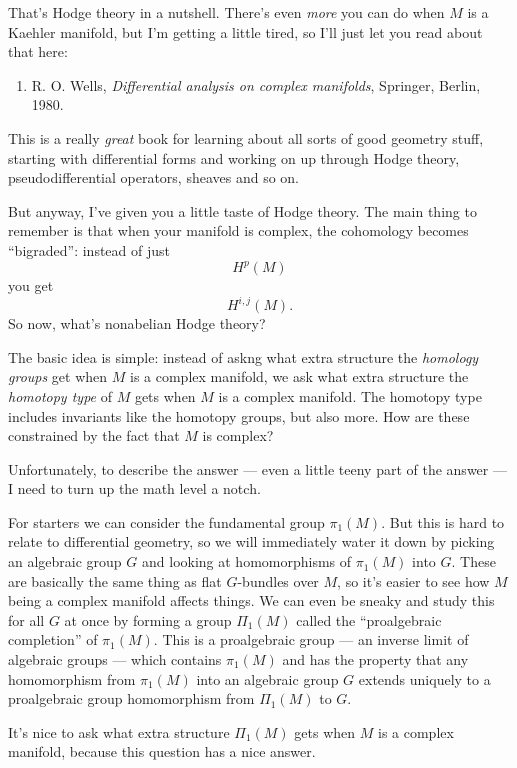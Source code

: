 \documentclass{article}
\def\tightlist{}
\begin{document}
That's Hodge theory in a nutshell. There's even \emph{more} you can do
when \(M\) is a Kaehler manifold, but I'm getting a little tired, so
I'll just let you read about that here:

\begin{enumerate}
\def\labelenumi{\arabic{enumi})}
\setcounter{enumi}{5}
\tightlist
\item
  R. O. Wells, \emph{Differential analysis on complex manifolds},
  Springer, Berlin, 1980.
\end{enumerate}

This is a really \emph{great} book for learning about all sorts of good
geometry stuff, starting with differential forms and working on up
through Hodge theory, pseudodifferential operators, sheaves and so on.

But anyway, I've given you a little taste of Hodge theory. The main
thing to remember is that when your manifold is complex, the cohomology
becomes ``bigraded'': instead of just \[H^p(M)\] you get \[H^{i,j}(M).\]
So now, what's nonabelian Hodge theory?

The basic idea is simple: instead of askng what extra structure the
\emph{homology groups} get when \(M\) is a complex manifold, we ask what
extra structure the \emph{homotopy type} of \(M\) gets when \(M\) is a
complex manifold. The homotopy type includes invariants like the
homotopy groups, but also more. How are these constrained by the fact
that \(M\) is complex?

Unfortunately, to describe the answer --- even a little teeny part of
the answer --- I need to turn up the math level a notch.

For starters we can consider the fundamental group \(\pi_1(M)\). But
this is hard to relate to differential geometry, so we will immediately
water it down by picking an algebraic group \(G\) and looking at
homomorphisms of \(\pi_1(M)\) into \(G\). These are basically the same
thing as flat \(G\)-bundles over \(M\), so it's easier to see how \(M\)
being a complex manifold affects things. We can even be sneaky and study
this for all \(G\) at once by forming a group \(\Pi_1(M)\) called the
``proalgebraic completion'' of \(\pi_1(M)\). This is a proalgebraic
group --- an inverse limit of algebraic groups --- which contains
\(\pi_1(M)\) and has the property that any homomorphism from
\(\pi_1(M)\) into an algebraic group \(G\) extends uniquely to a
proalgebraic group homomorphism from \(\Pi_1(M)\) to \(G\).

It's nice to ask what extra structure \(\Pi_1(M)\) gets when \(M\) is a
complex manifold, because this question has a nice answer.
\end{document}
